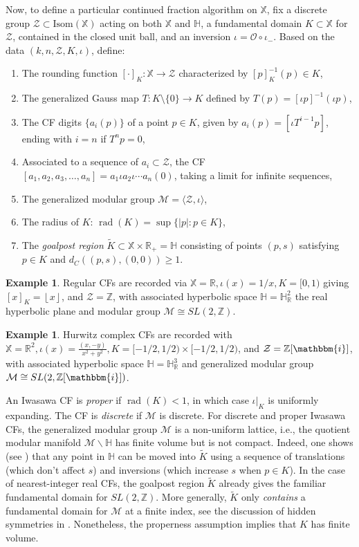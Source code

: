 \documentclass[reqno,10pt]{amsart}
\newcommand{\ii}{\mathbbm{i}}
\newcommand{\Hyp}{\mathbb{H}}
\newcommand{\R}{\mathbb{R}}
\newcommand{\Z}{\mathbb{Z}}
\newcommand{\X}{\mathbb X}
\newcommand{\norm}[1]{\left\vert #1 \right \vert}
\newcommand{\round}[1]{\left[#1\right]}
\newcommand{\floor}[1]{\left\lfloor #1 \right\rfloor}
\newcommand{\Isom}{\text{Isom}}
\newcommand{\rad}{\operatorname{rad}}
\numberwithin{thm}{section}
\theoremstyle{definition}
\theoremstyle{definition}
\newtheorem{example}[thm]{Example}
\numberwithin{equation}{section}
\newcommand{\Mod}{\mathcal M}
\newcommand{\Zee}{\mathcal Z}
\begin{document}
Now, to define a particular continued fraction algorithm on $\X$, fix a discrete group $\Zee \subset \Isom(\X)$ acting on both $\X$ and $\Hyp$, a fundamental domain $K\subset \X$ for $\Zee$, contained in the closed unit ball, and an inversion $\iota = \mathcal O \circ \iota_-$. 
Based on the data $(k, n, \Zee, K, \iota)$, define:
\begin{enumerate}
\item The rounding function $\round{\cdot}_K: \X\rightarrow \Zee$ characterized by $\round{p}_K^{-1}(p)\in K$,
\item The generalized Gauss map $T: K\setminus \{0\}\rightarrow K$ defined by $T(p) = \round{\iota p}^{-1}(\iota p)$,
\item The CF digits $\{a_i(p)\}$ of a point $p\in K$, given by $a_i(p)=[\iota T^{i-1}p]$, ending with $i=n$ if $T^n p=0$,
\item Associated to a sequence of $a_i\subset \Zee$, the CF $[a_1,a_2,a_3,\dots, a_n]=a_1 \iota a_2 \iota \cdots a_n(0)$, taking a limit for infinite sequences,
\item The generalized modular group $\Mod=\langle \Zee,\iota\rangle$,
\item The radius of $K$: $\rad(K)=\sup\{\norm{p}: p\in K\}$,
\item The \emph{goalpost region} $\tilde K\subset \X\times \R_+=\Hyp$ consisting of points $(p,s)$ satisfying $p\in K$ and $d_C((p,s),(0,0))\geq 1$.
\end{enumerate}

\begin{example}
Regular CFs are recorded via $\X=\R, \iota(x)=1/x, K=[0,1)$ giving $[x]_K=\floor{x}$, and $\Zee=\Z$, with associated hyperbolic space $\Hyp=\Hyp^2_\R$ the real hyperbolic plane and  modular group $\Mod\cong SL(2,\Z)$. 
\end{example}
\begin{example}Hurwitz complex CFs are recorded with $\X=\R^2, \iota(x)=\frac{(x,-y)}{x^2+y^2}, K=[-1/2,1/2)\times [-1/2,1/2)$, and $\Zee=\Z[\ii]$, with associated hyperbolic space $\Hyp=\Hyp^3_\R$ and generalized modular group $\Mod\cong SL(2,\Z[\ii])$.
\end{example}


An Iwasawa CF is \emph{proper} if $\rad(K)<1$, in which case $\iota\vert_K$ is uniformly expanding.
The CF is \emph{discrete} if $\Mod$ is discrete. For discrete and proper Iwasawa CFs, the generalized modular group $\Mod$ is a non-uniform lattice, i.e., the quotient modular manifold $\Mod\backslash\Hyp$ has finite volume but is not compact. Indeed, one shows (see \cite{lukyanenko_vandehey_2022}) that any point in $\Hyp$ can be moved into $\tilde K$ using a sequence of translations (which don't affect $s$) and inversions (which increase $s$ when $p\in K$). In the case of nearest-integer real CFs, the goalpost region $\tilde K$ already gives the familiar fundamental domain for $SL(2,\Z)$. More generally, $\tilde K$ only \emph{contains} a fundamental domain for $\Mod$ at a finite index, see the discussion of hidden symmetries in \cite{lukyanenko_vandehey_2022}. Nonetheless, the properness assumption implies that $K$ has finite volume. 
\end{document}
